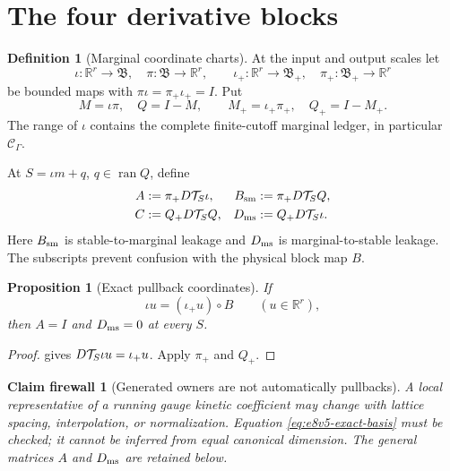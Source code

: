 \documentclass[11pt,oneside]{book}
\newtheorem{proposition}[theorem]{Proposition}
\newtheorem{firewall}[theorem]{Claim firewall}
\theoremstyle{definition}
\newtheorem{definition}[theorem]{Definition}
\theoremstyle{remark}
\begin{document}
\section{The four derivative blocks}
\label{sec:e8v5-blocks}

\begin{definition}[Marginal coordinate charts]
\label{def:e8v5-charts}
At the input and output scales let
\[
 \iota:\mathbb R^r\to{\mathfrak B},\quad
 \pi:{\mathfrak B}\to\mathbb R^r,\qquad
 \iota_+:\mathbb R^r\to{\mathfrak B}_+,\quad
 \pi_+:{\mathfrak B}_+\to\mathbb R^r                \label{eq:e8v5-charts}
\]
be bounded maps with
\(\pi\iota=\pi_+\iota_+=I\).  Put
\[
 M=\iota\pi,\quad Q=I-M,\qquad
 M_+=\iota_+\pi_+,\quad Q_+=I-M_+.                  \label{eq:e8v5-MQ}
\]
The range of \(\iota\) contains the complete finite-cutoff marginal
ledger, in particular \({\mathcal C}_\Gamma\).
\end{definition}

At \(S=\iota m+q\), \(q\in\operatorname{ran}Q\), define
\begin{align}
 A&:=\pi_+D{\cal T}_S\iota,
 &B_{\rm sm}&:=\pi_+D{\cal T}_S Q,                  \label{eq:e8v5-AB}\\
 C&:=Q_+D{\cal T}_S Q,
 &D_{\rm ms}&:=Q_+D{\cal T}_S\iota.                \label{eq:e8v5-CD}
\end{align}
Here \(B_{\rm sm}\) is stable-to-marginal leakage and
\(D_{\rm ms}\) is marginal-to-stable leakage.  The subscripts prevent
confusion with the physical block map \(B\).

\begin{proposition}[Exact pullback coordinates]
\label{prop:e8v5-exact-coordinate}
If
\[
 \iota u=(\iota_+u)\circ B\qquad(u\in\mathbb R^r),   \label{eq:e8v5-exact-basis}
\]
then \(A=I\) and \(D_{\rm ms}=0\) at every \(S\).
\end{proposition}

\begin{proof}
 gives
\(D{\cal T}_S\iota u=\iota_+u\).  Apply \(\pi_+\) and \(Q_+\).
\end{proof}

\begin{firewall}[Generated owners are not automatically pullbacks]
\label{fire:e8v5-generated}
A local representative of a running gauge kinetic coefficient may
change with lattice spacing, interpolation, or normalization.
Equation \eqref{eq:e8v5-exact-basis} must be checked; it cannot be
inferred from equal canonical dimension.  The general matrices
\(A\) and \(D_{\rm ms}\) are retained below.
\end{firewall}
\end{document}
